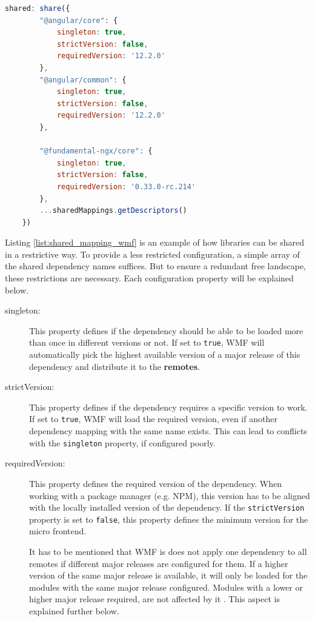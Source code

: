 \begin{lstlisting}[language=JavaScript, caption=Example of sharing dependencies configured in the \texttt{webpack.config.js}, label=list:shared_mapping_wmf,  xleftmargin=.0\textwidth, xrightmargin=.0\textwidth]
	shared: share({
		"@angular/core": { 
			singleton: true, 
			strictVersion: false, 
			requiredVersion: '12.2.0' 
		},
		"@angular/common": { 
			singleton: true, 
			strictVersion: false, 
			requiredVersion: '12.2.0' 
		},
	
		"@fundamental-ngx/core": { 
			singleton: true, 
			strictVersion: false, 
			requiredVersion: '0.33.0-rc.214' 
		},
		...sharedMappings.getDescriptors()
	})
\end{lstlisting}

Listing \ref{list:shared_mapping_wmf} is an example of how libraries can be shared in a restrictive way. To provide a less restricted configuration, a simple array of the shared dependency names suffices. But to ensure a redundant free landscape, these restrictions are necessary. Each configuration property will be explained below.

\begin{description}
	\item[singleton:] This property defines if the dependency should be able to be loaded more than once in different versions or not. If set to \texttt{true}, WMF will automatically pick the highest available version of a major release of this dependency and distribute it to the \textbf{remotes}.\cite{wmf_version_mismatch}	
	
	\item[strictVersion:] This property defines if the dependency requires a specific version to work. If set to \texttt{true}, WMF will load the required version, even if another dependency mapping with the same name exists. This can lead to conflicts with the \texttt{singleton} property, if configured poorly.
	
	\item[requiredVersion:] This property defines the required version of the dependency. When working with a package manager (e.g. NPM), this version has to be aligned with the locally installed version of the dependency. If the \texttt{strictVersion} property is set to \texttt{false}, this property defines the minimum version for the micro frontend. 
	
	It has to be mentioned that WMF is does not apply one dependency to all remotes if different major releases are configured for them. If a higher version of the same major release is available, it will only be loaded for the modules with the same major release configured. Modules with a lower or higher major release required, are not affected by it \cite{wmf_multi_versions}. This aspect is explained further below.
\end{description}

